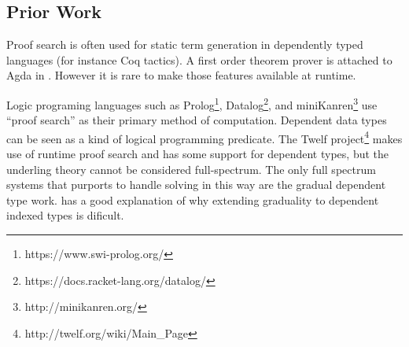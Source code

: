 \subsection{Prior Work}

Proof search is often used for static term generation in dependently typed languages (for instance Coq tactics).
A first order theorem prover is attached to Agda in \cite{norell2007towards}.
However it is rare to make those features available at runtime. 

Logic programing languages such as Prolog\footnote{https://www.swi-prolog.org/}, Datalog\footnote{https://docs.racket-lang.org/datalog/}, and miniKanren\footnote{http://minikanren.org/} use ``proof search'' as their primary method of computation.
Dependent data types can be seen as a kind of logical programming predicate.
The Twelf project\footnote{http://twelf.org/wiki/Main\_Page} makes use of runtime proof search and has some support for dependent types, but the underling theory cannot be considered full-spectrum.
The only full spectrum systems that purports to handle solving in this way are the gradual dependent type work\cite{DBLP:journals/corr/abs-1906-06469}.
\cite{bertrand:hal-02896776} has a good explanation of why extending graduality to dependent indexed types is dificult.
